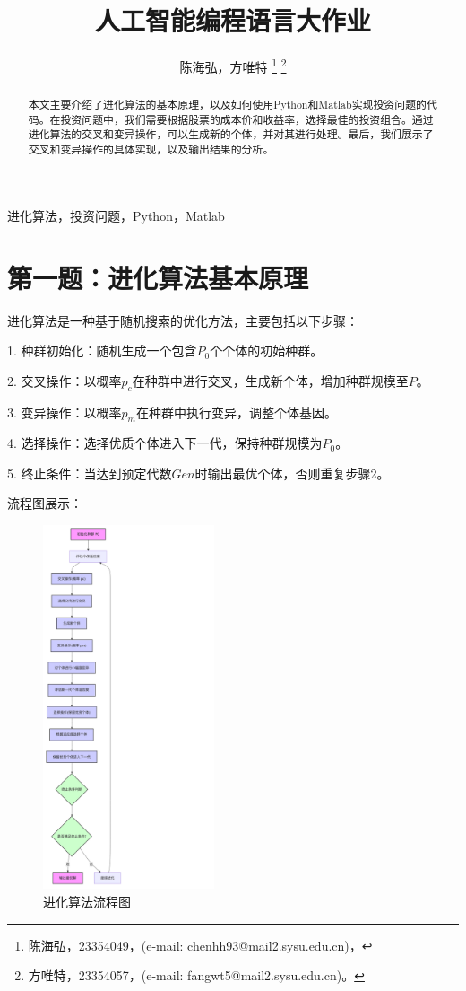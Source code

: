 \documentclass[journal,twoside,web]{ieeecolor}
\begin{document}
\title{人工智能编程语言大作业}
\author{陈海弘，方唯特
\thanks{陈海弘，23354049，(e-mail: chenhh93@mail2.sysu.edu.cn)，}
\thanks{方唯特，23354057，(e-mail: fangwt5@mail2.sysu.edu.cn)。}
}

\maketitle

\begin{abstract}
    本文主要介绍了进化算法的基本原理，以及如何使用Python和Matlab实现投资问题的代码。在投资问题中，我们需要根据股票的成本价和收益率，选择最佳的投资组合。通过进化算法的交叉和变异操作，可以生成新的个体，并对其进行处理。最后，我们展示了交叉和变异操作的具体实现，以及输出结果的分析。
\end{abstract}

\begin{IEEEkeywords}
    进化算法，投资问题，Python，Matlab
\end{IEEEkeywords}
\section{第一题：进化算法基本原理}
    进化算法是一种基于随机搜索的优化方法，主要包括以下步骤：

	1.	种群初始化：随机生成一个包含$P_0$个个体的初始种群。

	2.	交叉操作：以概率$p_c$在种群中进行交叉，生成新个体，增加种群规模至$P$。

	3.	变异操作：以概率$p_m$在种群中执行变异，调整个体基因。

	4.	选择操作：选择优质个体进入下一代，保持种群规模为$P_0$。

	5.	终止条件：当达到预定代数$Gen$时输出最优个体，否则重复步骤2。

 流程图展示：
\begin{figure}[H]
    \hspace{3cm}
    \includegraphics[width=0.45\textwidth]{img/graph.png}
    \caption{进化算法流程图}
\end{figure}
\end{document}
